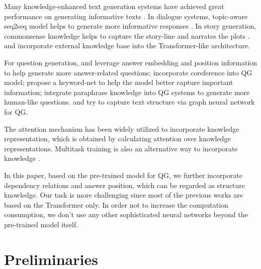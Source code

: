 \documentclass[11pt]{article}
\begin{document}
Many knowledge-enhanced text generation systems have achieved great performance on generating informative texts \cite{yu2020survey}. In dialogue systems, topic-aware seq2seq model helps to generate more informative responses \citep{mou-etal-2016-sequence, Xing_Wu_Wu_Liu_Huang_Zhou_Ma_2017, ijcai2018-0643}. In story generation, commonsense knowledge helps to capture the story-line and narrates the plots \citep{Guan_Wang_Huang_2019}.
\citet{Liu_Zhou_Zhao_Wang_Ju_Deng_Wang_2020} and \citet{Huang_Fu_Mo_Cai_Xu_Li_Li_Leung_2021} incorporate external knowledge base into the Transformer-like architecture.

For question generation, \citet{zhou2017neural} and \citet{sun-etal-2018-answer} leverage answer embedding and position information to help generate more answer-related questions; \citet{du-cardie-2018-harvesting} incorporate coreference into QG model; \citet{Kim_Lee_Shin_Jung_2019} propose a keyword-net to help the model better capture important information; \citet{jia-etal-2020-ask} integrate paraphrase knowledge into QG systems to generate more human-like questions. 
\citet{Chen2020Reinforcement} and  \citet{pan-etal-2020-semantic} try to capture text structure via graph neural network for QG.  

The attention mechanism has been widely utilized to incorporate knowledge representation, 
which is obtained by calculating attention over knowledge representations. Multitask training is also an alternative way to incorporate knowledge \citep{Kim2020Sequential, jia-etal-2020-ask}. 

In this paper, based on the pre-trained model for QG, we further incorporate dependency relations and answer position, which can be regarded as structure knowledge. Our task is more challenging
since 
most of the previous works are based on the Transformer only. In order not to increase the computation consumption, we don't use any other sophisticated neural networks beyond the pre-trained model itself.

\section{Preliminaries}
\end{document}

